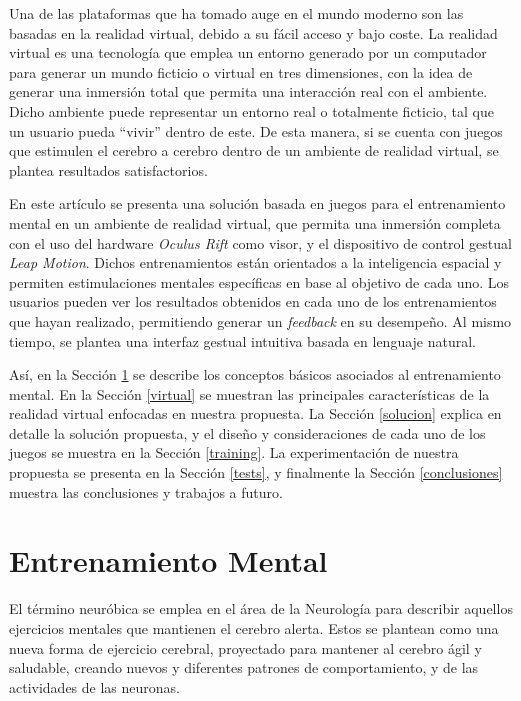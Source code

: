 \documentclass[conference]{IEEEtran}
\begin{document}
Una de las plataformas que ha tomado auge en el mundo moderno son las basadas en la realidad virtual, debido a su fácil acceso y bajo coste. La realidad virtual es una tecnología que emplea un entorno generado por un computador para generar un mundo ficticio o virtual en tres dimensiones, con la idea de generar una inmersión total que permita una interacción real con el ambiente. Dicho ambiente puede representar un entorno real o totalmente ficticio, tal que un usuario pueda ``vivir'' dentro de este. De esta manera, si se cuenta con juegos que estimulen el cerebro a cerebro dentro de un ambiente de realidad virtual, se plantea resultados satisfactorios. 
  
En este artículo se presenta una solución basada en juegos para el entrenamiento mental en un ambiente de realidad virtual, que permita una inmersión completa con el uso del hardware \textit{Oculus Rift} como visor, y el dispositivo de control gestual \textit{Leap Motion}. Dichos entrenamientos están orientados a la inteligencia espacial y permiten estimulaciones mentales específicas en base al objetivo de cada uno. Los usuarios pueden ver los resultados obtenidos en cada uno de los entrenamientos que hayan realizado, permitiendo generar un \textit{feedback} en su desempeño. Al mismo tiempo, se plantea una interfaz gestual intuitiva basada en lenguaje natural. 

Así, en la Sección \ref{entrenamiento} se describe los conceptos básicos asociados al entrenamiento mental. En la Sección \ref{virtual} se muestran las principales características de la realidad virtual enfocadas en nuestra propuesta. La Sección \ref{solucion} explica en detalle la solución propuesta, y el diseño y consideraciones de cada uno de los juegos se muestra en la Sección \ref{training}. La experimentación de nuestra propuesta se presenta en la Sección \ref{tests}, y finalmente la Sección \ref{conclusiones} muestra las conclusiones y trabajos a futuro.

\section{Entrenamiento Mental} \label{entrenamiento}

El término neuróbica \cite{NEU1,NEU2} se emplea en el área de la Neurología para describir aquellos ejercicios mentales que mantienen el cerebro alerta. Estos se plantean como una nueva forma de ejercicio cerebral, proyectado para mantener al cerebro ágil y saludable, creando nuevos y diferentes patrones de comportamiento, y de las actividades de las neuronas.
\end{document}
